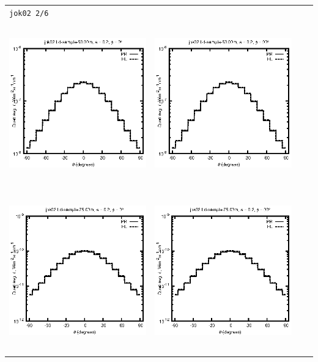 \documentclass[10pt,a4paper]{article}
\begin{document}
\begin{adjustwidth}{-1.2in}{-1.2in}
\begin{tabular}{c c c c}
\multicolumn{4}{l}{\texttt{jok02 2/6}} \\
\includegraphics[height=7cm]{../eps/jok02_Ld_sample_50.00m_fwd.eps} &
\includegraphics[height=7cm]{../eps/jok02_Ld_sample_50.00m_cross.eps} \\
\includegraphics[height=7cm]{../eps/jok02_Ld_sample_75.00m_fwd.eps} &
\includegraphics[height=7cm]{../eps/jok02_Ld_sample_75.00m_cross.eps} \\

\end{tabular}
\end{adjustwidth}
\end{document}
